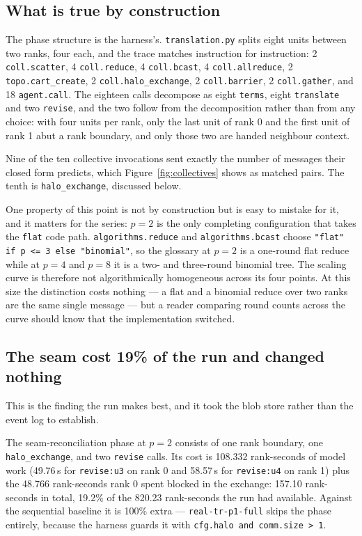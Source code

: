 \documentclass[11pt]{article}
\begin{document}
\subsection*{What is true by construction}

The phase structure is the harness's. \texttt{translation.py} splits eight units between two
ranks, four each, and the trace matches instruction for instruction: 2 \texttt{coll.scatter}, 4
\texttt{coll.reduce}, 4 \texttt{coll.bcast}, 4 \texttt{coll.allreduce}, 2
\texttt{topo.cart\_create}, 2 \texttt{coll.halo\_exchange}, 2 \texttt{coll.barrier}, 2
\texttt{coll.gather}, and 18 \texttt{agent.call}. The eighteen calls decompose as eight
\texttt{terms}, eight \texttt{translate} and two \texttt{revise}, and the two follow from the
decomposition rather than from any choice: with four units per rank, only the last unit of rank 0
and the first unit of rank 1 abut a rank boundary, and only those two are handed neighbour
context.

Nine of the ten collective invocations sent exactly the number of messages their closed form
predicts, which Figure~\ref{fig:collectives} shows as matched pairs. The tenth is
\texttt{halo\_exchange}, discussed below.

One property of this point is not by construction but is easy to mistake for it, and it matters
for the series: $p=2$ is the only completing configuration that takes the \texttt{flat} code path.
\texttt{algorithms.reduce} and \texttt{algorithms.bcast} choose \texttt{"flat" if p <= 3 else
"binomial"}, so the glossary at $p=2$ is a one-round flat reduce while at $p=4$ and $p=8$ it is a
two- and three-round binomial tree. The scaling curve is therefore not algorithmically
homogeneous across its four points. At this size the distinction costs nothing --- a flat and a
binomial reduce over two ranks are the same single message --- but a reader comparing round counts
across the curve should know that the implementation switched.

\subsection*{The seam cost 19\% of the run and changed nothing}

This is the finding the run makes best, and it took the blob store rather than the event log to
establish.

The seam-reconciliation phase at $p=2$ consists of one rank boundary, one \texttt{halo\_exchange},
and two \texttt{revise} calls. Its cost is 108.332 rank-seconds of model work (49.76\,s for
\texttt{revise:u3} on rank 0 and 58.57\,s for \texttt{revise:u4} on rank 1) plus the 48.766
rank-seconds rank 0 spent blocked in the exchange: 157.10 rank-seconds in total, 19.2\% of the
820.23 rank-seconds the run had available. Against the sequential baseline it is 100\% extra ---
\texttt{real-tr-p1-full} skips the phase entirely, because the harness guards it with
\texttt{cfg.halo and comm.size > 1}.
\end{document}
